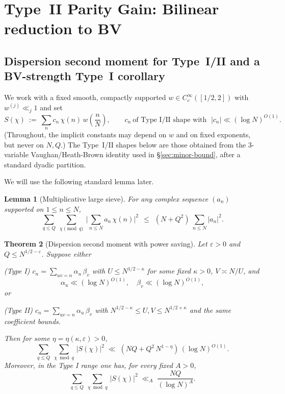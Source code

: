 \documentclass[11pt]{article}
\newtheorem{lemma}{Lemma}[part]
\newtheorem{theorem}[lemma]{Theorem}
\theoremstyle{definition}
\theoremstyle{remark}
\numberwithin{equation}{part}
\begin{document}
\section{Type~II Parity Gain: Bilinear reduction to BV}\label{sec:typeII}

\subsection*{Dispersion second moment for Type~I/II and a BV-strength Type~I corollary}
\label{subsec:dispersion-L2}

We work with a fixed smooth, compactly supported $w\in C_c^\infty([1/2,2])$ with $w^{(j)}\ll_j 1$ and set
\[
	S(\chi)\ :=\ \sum_{n} c_n\,\chi(n)\,w\!\left(\frac{n}{N}\right),
	\qquad c_n\ \text{of Type I/II shape with }\; |c_n|\ll (\log N)^{O(1)}.
\]
(Throughout, the implicit constants may depend on $w$ and on fixed exponents, but never on $N,Q$.) The Type~I/II shapes below are those obtained from the 3-variable Vaughan/Heath-Brown identity used in \S\ref{sec:minor-bound}, after a standard dyadic partition.

We will use the following standard lemma later.
\begin{lemma}[Multiplicative large sieve]\label{lem:mls}
	For any complex sequence $(a_n)$ supported on $1\le n\le N$,
	\[
		\sum_{q\le Q}\ \sum_{\chi\!\!\!\pmod q}\ \Big|\sum_{n\le N} a_n\,\chi(n)\Big|^2
		\ \ \le\ \ (N+Q^2)\ \sum_{n\le N} |a_n|^2.
	\]
\end{lemma}

\begin{theorem}[Dispersion second moment with power saving]
	\label{thm:BVP2M}
	Let $\varepsilon>0$ and $Q\le N^{1/2-\varepsilon}$. Suppose either

	\smallskip
	\noindent\emph{(Type I)} $c_n=\sum_{uv=n}\alpha_u\,\beta_v$ with $U\le N^{1/2-\kappa}$ for some fixed $\kappa>0$, $V\asymp N/U$, and
	\[
		\alpha_u\ll (\log N)^{O(1)},\quad \beta_v\ll (\log N)^{O(1)},
	\]
	or

	\smallskip
	\noindent\emph{(Type II)} $c_n=\sum_{uv=n}\alpha_u\,\beta_v$ with $N^{1/2-\kappa}\le U,V\le N^{1/2+\kappa}$ and the same coefficient bounds.

	\smallskip
	Then for some $\eta=\eta(\kappa,\varepsilon)>0$,
	\begin{equation}\label{eq:BVP2M}
		\sum_{q\le Q}\ \sum_{\chi \bmod q}\, \big|S(\chi)\big|^2
		\;\ll\; (NQ+Q^2\,N^{1-\eta})\,(\log N)^{O(1)}.
	\end{equation}
	Moreover, in the \emph{Type I} range one has, for every fixed $A>0$,
	\begin{equation}\label{eq:dispersion-NQ}
		\sum_{q\le Q}\ \sum_{\chi \bmod q}\, \big|S(\chi)\big|^2
		\;\ll_A\; \frac{NQ}{(\log N)^{A}}.
	\end{equation}
\end{theorem}
\end{document}

